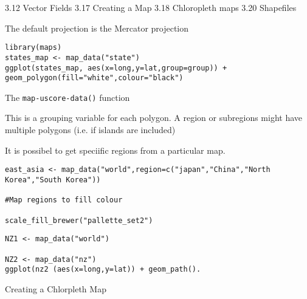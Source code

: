 3.12 Vector Fields
3.17 Creating a Map
3.18 Chloropleth maps
3.20 Shapefiles

The default projection is the Mercator projection

\begin{verbatim}
library(maps)
states_map <- map_data("state")
ggplot(states_map, aes(x=long,y=lat,group=group)) + geom_polygon(fill="white",colour="black")
\end{verbatim}



The \texttt{map-uscore-data()} function

This is a grouping variable for each polygon. A region or subregions might have multiple polygons (i.e. if islands are
included)


It is possibel to get speciific regions from a particular map.

\begin{verbatim}
east_asia <- map_data("world",region=c("japan","China","North Korea","South Korea"))

#Map regions to fill colour

scale_fill_brewer("pallette_set2")
\end{verbatim}
\begin{verbatim}
NZ1 <- map_data("world")

NZ2 <- map_data("nz")
ggplot(nz2 (aes(x=long,y=lat)) + geom_path().
\end{verbatim}
Creating a Chlorpleth Map


